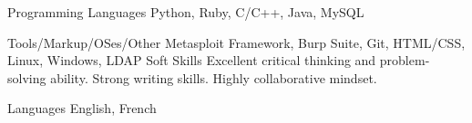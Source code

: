 

\begin{cvskills}

  \cvskill
    {Programming Languages} %
    {Python, Ruby, C/C++, Java, MySQL} %

  \cvskill
    {Tools/Markup/OSes/Other} %
    {Metasploit Framework, Burp Suite, Git, HTML/CSS, Linux, Windows, LDAP} %
  \cvskill
    {Soft Skills} %
    {Excellent critical thinking and problem-solving ability. Strong writing skills. Highly collaborative mindset. } %

  \cvskill
    {Languages} %
    {English, French} %

\end{cvskills}